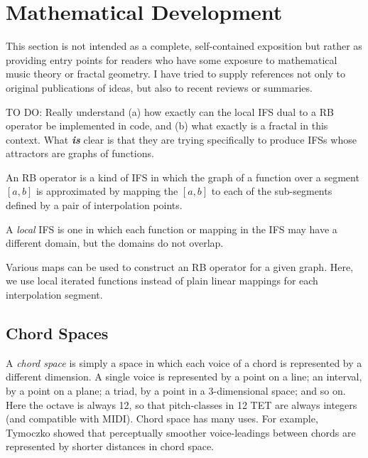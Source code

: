 \documentclass[english,11pt,letterpaper,onecolumn]{scrartcl}
\numberwithin{equation}{section}
\begin{document}
    \section{Mathematical Development}
    
    This section is not intended as a complete, self-contained exposition but 
    rather as providing entry points for readers who have some exposure to 
    mathematical music theory or fractal geometry. I have tried to supply 
    references not only to original publications of ideas, but also to recent 
    reviews or summaries.
    
    TO DO: Really understand (a) how exactly can the local IFS dual to a RB 
    operator be implemented in code, and (b) what exactly is a fractal in this 
    context. What \textit{\textbf{is}} clear is that they are trying specifically 
    to produce IFSs whose attractors are graphs of functions.
    
    An RB operator is a kind of IFS in which the graph of a function over a 
segment 
    $[a, b]$ is approximated by mapping the $[a, b]$ to each of the 
sub-segments 
    defined by a pair of interpolation points.
    
    A \textit{local} IFS is one in which each function or mapping in the IFS 
    may have a different domain, but the domains do not overlap.
    
    Various maps can be used to construct an RB operator for a given graph. Here, 
    we use local iterated functions instead of plain linear mappings for each 
    interpolation segment.
    
    \subsection{Chord Spaces}
    
    A \textit{chord space} is simply a space in which each voice of a chord is 
    represented by a different dimension. A single voice is represented by a 
point 
    on a line; an interval, by a point on a plane; a triad, by a point in a 
    3-dimensional space; and so on. Here the octave is always 12, so that 
    pitch-classes in 12 TET are always integers (and compatible with MIDI). 
Chord 
    space has many uses. For example, Tymoczko \cite{tymoczko2006geometry, 
        tymoczko2011geometry} showed that perceptually smoother voice-leadings 
between 
    chords are represented by shorter distances in chord space. 
    
\end{document}

